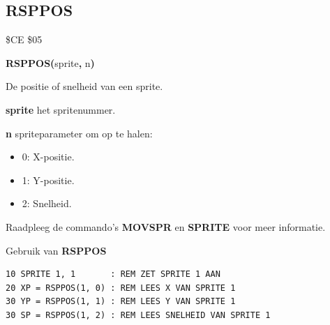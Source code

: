 
\newpage
\subsection{RSPPOS}
\begin{description}[leftmargin=2cm,style=nextline]
\item [Token:]    \$CE \$05

\item [Formaat:]   {\bf RSPPOS(}sprite{\bf,} n{\bf)}

\item [Retourneert:]  De positie of snelheid van een sprite.

                  {\bf sprite} het spritenummer.

                  {\bf n} spriteparameter om op te halen:

                  \begin{itemize}
                     \item 0: X-positie.                     \item 1: Y-positie.                     \item 2: Snelheid.
                  \end{itemize}

\item [Opmerkingen:]  Raadpleeg de commando's {\bf MOVSPR} en {\bf SPRITE} voor meer informatie.

\item [Voorbeeld:]  Gebruik van {\bf RSPPOS}
\begin{tcolorbox}[colback=black,coltext=white]
\verbatimfont{\codefont}
\begin{verbatim}
10 SPRITE 1, 1       : REM ZET SPRITE 1 AAN
20 XP = RSPPOS(1, 0) : REM LEES X VAN SPRITE 1
30 YP = RSPPOS(1, 1) : REM LEES Y VAN SPRITE 1
30 SP = RSPPOS(1, 2) : REM LEES SNELHEID VAN SPRITE 1
\end{verbatim}
\end{tcolorbox}
\end{description}


\newpage
